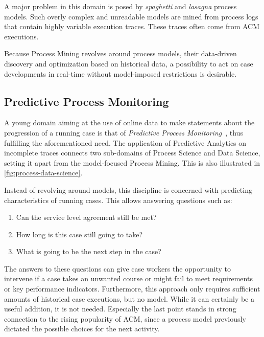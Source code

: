A major problem in this domain is posed by \textit{spaghetti} and \textit{lasagna} process models. Such overly complex and unreadable models are mined from process logs that contain highly variable execution traces. These traces often come from ACM executions.

Because Process Mining revolves around process models, their data-driven discovery and optimization based on historical data, a possibility to act on case developments in real-time without model-imposed restrictions is desirable.

\subsection{Predictive Process Monitoring}\label{sec:predictive-process-monitoring}
A young domain aiming at the use of online data to make statements about the progression of a running case is that of \textit{Predictive Process Monitoring}~\cite{francescomarino2015, schoenig2018}, thus fulfilling the aforementioned need. The application of Predictive Analytics on incomplete traces connects two sub-domains of Process Science and Data Science, setting it apart from the model-focused Process Mining. This is also illustrated in \autoref{fig:process-data-science}.

Instead of revolving around models, this discipline is concerned with predicting characteristics of running cases. This allows answering questions such as:

\begin{enumerate}
    \item Can the service level agreement still be met?
    \item How long is this case still going to take?
    \item What is going to be the next step in the case?
\end{enumerate}

The answers to these questions can give case workers the opportunity to intervene if a case takes an unwanted course or might fail to meet requirements or key performance indicators. Furthermore, this approach only requires sufficient amounts of historical case executions, but no model. While it can certainly be a useful addition, it is not needed. Especially the last point stands in strong connection to the rising popularity of ACM, since a process model previously dictated the possible choices for the next activity.

